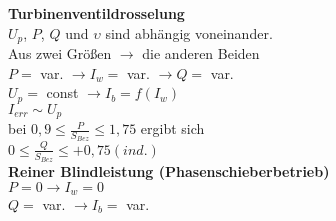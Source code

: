 \textbf{Turbinenventildrosselung}\\
$U_p$, $ P$, $Q$ und $\upsilon$ sind abhängig voneinander. \\
Aus zwei Größen $\rightarrow$ die anderen Beiden\\
\indent $P =$ var. $\rightarrow I_w= $ var. $\rightarrow Q =$ var.\\
\indent $U_p =$ const $\rightarrow I_b = f(I_w)$\\
\indent $I_{err} \sim U_p$ \\
\indent bei $0,9 \leq \frac{P}{S_{Bez}} \leq 1,75$ ergibt sich\\
\indent $0 \leq \frac{Q}{S_{Bez}} \leq +0,75(ind.)$\\


\textbf{Reiner Blindleistung (Phasenschieberbetrieb)}\\
\indent $P = 0 \rightarrow I_w= 0$ \\
\indent $Q =$ var. $\rightarrow I_b = $ var.
